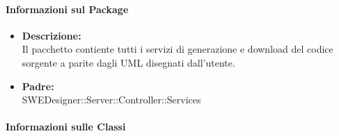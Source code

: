 		\paragraph{Informazioni sul Package}
		\begin{itemize}
			\item \textbf{Descrizione: }\\
			Il pacchetto contiente tutti i servizi di generazione e download del codice sorgente a parite dagli UML	disegnati dall'utente.
			\item \textbf{Padre: }\\ SWEDesigner::Server::Controller::Services
		\end{itemize}
		\paragraph{Informazioni sulle Classi}
